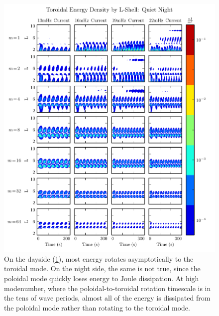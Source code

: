 \begin{figure}[!htb]
    \centering
    \includegraphics[width=\textwidth]{figures/layers_night_t.pdf}
    \caption[Nightside Toroidal Energy Distribution]{
      On the dayside (\cref{fig_layers_night_t}), most energy rotates asymptotically to the toroidal mode. On the night side, the same is not true, since the poloidal mode quickly loses energy to Joule dissipation. At high modenumber, where the poloidal-to-toroidal rotation timescale is in the tens of wave periods, almost all of the energy is dissipated from the poloidal mode rather than rotating to the toroidal mode. 
    }
    \label{fig_layers_night_t}
\end{figure}



